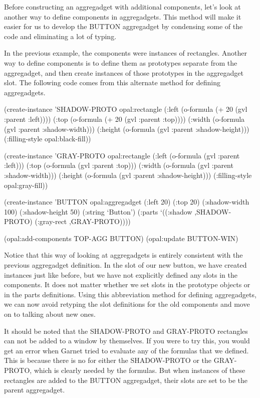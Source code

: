 Before constructing an aggregadget with additional components, let's
look at another way to define components in aggregadgets.  This method
will make it easier for us to develop the BUTTON aggregadget by
condensing some of the code and eliminating a lot of typing.

In the previous example, the components were instances of rectangles.
Another way to define components is to define them as prototypes
separate from the aggregadget, and then create instances of those
prototypes in the aggregadget  slot.  The following code
comes from this alternate method for defining aggregadgets.

\begin{programexample}
(create-instance 'SHADOW-PROTO opal:rectangle
   (:left (o-formula (+ 20 (gvl :parent :left))))
   (:top (o-formula (+ 20 (gvl :parent :top))))
   (:width (o-formula (gvl :parent :shadow-width)))
   (:height (o-formula (gvl :parent :shadow-height)))
   (:filling-style opal:black-fill))

(create-instance 'GRAY-PROTO opal:rectangle
   (:left (o-formula (gvl :parent :left)))
   (:top (o-formula (gvl :parent :top)))
   (:width (o-formula (gvl :parent :shadow-width)))
   (:height (o-formula (gvl :parent :shadow-height)))
   (:filling-style opal:gray-fill))

(create-instance 'BUTTON opal:aggregadget
   (:left 20) (:top 20)
   (:shadow-width 100) (:shadow-height 50)
   (:string `Button')
   (:parts
    `((:shadow ,SHADOW-PROTO)
      (:gray-rect ,GRAY-PROTO))))

(opal:add-components TOP-AGG BUTTON)
(opal:update BUTTON-WIN)
\end{programexample}


Notice that this way of looking at aggregadgets is entirely consistent
with the previous aggregadget definition.  In the  slot of
our new button, we have created instances just like before, but we
have not explicitly defined any slots in the components.  It does not matter
whether we set slots in the prototype objects or in the parts
definitions.  Using this abbreviation method for defining aggregadgets,
we can now avoid retyping the slot definitions for the old components
and move on to talking about new ones.

It should be noted that the SHADOW-PROTO and GRAY-PROTO rectangles can
not be added to a window by themselves.  If you were to try this, you
would get an error when Garnet tried to evaluate any of the formulas
that we defined.  This is because there is no  for either
the SHADOW-PROTO or the GRAY-PROTO, which is clearly needed by the
formulas.  But when instances of these rectangles are added to the BUTTON
aggregadget, their  slots are set to be the parent aggregadget.

